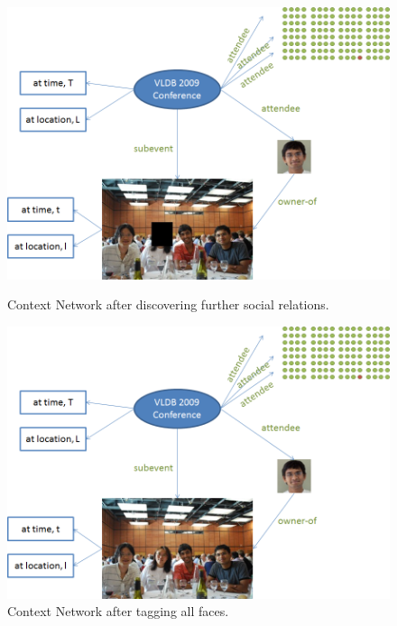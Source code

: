\begin{figure}[h!]
\begin{minipage}[b]{0.5\linewidth}
\centering
\includegraphics[width=\textwidth]{media/chapter4/stacktrace/vldb-network-7.png}
\caption{Context Network after discovering further social relations.}
\label{fig:vldb-network-7}
\end{minipage}
\hspace{0.5cm}
\begin{minipage}[b]{0.5\linewidth}
\centering
\includegraphics[width=\textwidth]{media/chapter4/stacktrace/vldb-network-8.png}
\caption{Context Network after tagging all faces.}
\label{fig:vldb-network-8}
\end{minipage}
\end{figure}

